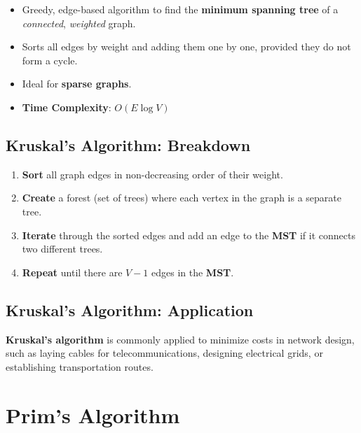 \documentclass[12pt, letterpaper]{article}
\begin{document}
\begin{itemize}
    \item Greedy, edge-based algorithm to find the \textbf{minimum spanning tree} of a \textit{connected}, \textit{weighted} graph.
    \item Sorts all edges by weight and adding them one by one, provided they do not form a cycle.
    \item Ideal for \textbf{sparse graphs}.
    \item \textbf{Time Complexity}: $ O(E \log V) $
\end{itemize}

\subsection*{Kruskal's Algorithm: Breakdown}

\begin{enumerate}
    \item \textbf{Sort} all graph edges in non-decreasing order of their weight.
    \item \textbf{Create} a forest (set of trees) where each vertex in the graph is a separate tree.
    \item \textbf{Iterate} through the sorted edges and add an edge to the \textbf{MST} if it connects two different trees.
    \item \textbf{Repeat} until there are $ V - 1 $ edges in the \textbf{MST}.
\end{enumerate}

\subsection*{Kruskal's Algorithm: Application}

\textbf{Kruskal's algorithm} is commonly applied to minimize costs in network design, such as laying cables for telecommunications, designing electrical grids, or establishing transportation routes.

\section*{Prim's Algorithm}
\end{document}
